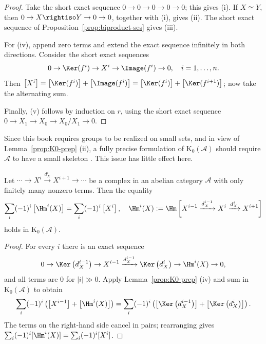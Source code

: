 \begin{proof}
Take the short exact sequence $0\to0\to0\to0\to0$; this gives (i). If
$X\simeq Y$, then $0\to X\rightiso Y\to0\to0$, together with (i), gives
(ii). The short exact sequence of Proposition~\ref{prop:biproduct-ses} gives
(iii).

For (iv), append zero terms and extend the exact sequence infinitely in both
directions. Consider the short exact sequences
\[0\to\Ker(f^i)\to X^i\to\Image(f^i)\to0,\quad i=1,\ldots,n.\]
Then
$\left[X^i\right]=\left[\Ker(f^i)\right]+\left[\Image(f^i)\right]
=\left[\Ker(f^i)\right]+\left[\Ker(f^{i+1})\right]$;
now take the alternating sum.

Finally, (v) follows by induction on $r$, using the short exact sequence
$0\to X_1\to X_0\to X_0/X_1\to0$.
\end{proof}

\begin{remark}
Since this book requires groups to be realized on small sets, and in view of
Lemma~\ref{prop:K0-prep} (ii), a fully precise formulation of
$\mathrm{K}_0(\mathcal{A})$ should require $\mathcal{A}$ to have a small
skeleton \cite[Lemma 2.2.12]{Li1}. This issue has little effect here.
\end{remark}

\begin{theorem}\label{prop:EP}
Let
$\cdots\to X^i\xrightarrow{d_X^i}X^{i+1}\to\cdots$ be a complex in an
abelian category $\mathcal{A}$ with only finitely many nonzero terms. Then the
equality
\[\sum_i(-1)^i\left[\Hm^i(X)\right]
=\sum_i(-1)^i\left[X^i\right],\quad
\Hm^i(X):=\Hm\left[X^{i-1}\xrightarrow{d_X^{i-1}}X^i
\xrightarrow{d_X^i}X^{i+1}\right]\]
holds in $\mathrm{K}_0(\mathcal{A})$.
\end{theorem}

\begin{proof}
For every $i$ there is an exact sequence
\[0\to\Ker\left(d_X^{i-1}\right)\to X^{i-1}
\xrightarrow{d_X^{i-1}}\Ker\left(d_X^i\right)
\to\Hm^i(X)\to0,\]
and all terms are $0$ for $|i|\gg0$. Apply Lemma~\ref{prop:K0-prep} (iv) and
sum in $\mathrm{K}_0(\mathcal{A})$ to obtain
\[\sum_i(-1)^i
\left(\left[X^{i-1}\right]+\left[\Hm^i(X)\right]\right)
=\sum_i(-1)^i
\left(\left[\Ker\left(d_X^{i-1}\right)\right]
+\left[\Ker\left(d_X^i\right)\right]\right).\]
The terms on the right-hand side cancel in pairs; rearranging gives
$\sum_i(-1)^i[\Hm^i(X)]=\sum_i(-1)^i[X^i]$.
\end{proof}

